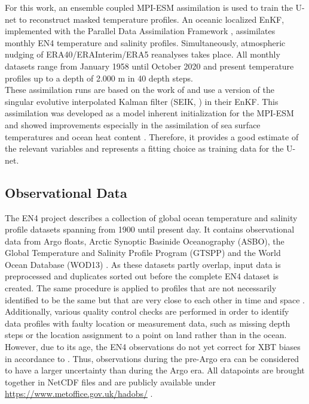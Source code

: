 \documentclass[Masterarbeit.tex]{subfile}
\begin{document}
	For this work, an ensemble coupled MPI-ESM assimilation \citep{brune_mpi-esm-lr_1201p5_2021} is used to train the U-net to reconstruct masked temperature profiles. An oceanic localized EnKF, implemented with the Parallel Data Assimilation Framework \citep{nerger_software_2013}, assimilates monthly EN4 temperature and salinity profiles. Simultaneously, atmospheric nudging of ERA40/ERAInterim/ERA5 reanalyses \citep{uppala_era-40_2005, dee_era-interim_2011, hersbach_era5_2020} takes place. All monthly datasets range from January 1958 until October 2020 and present temperature profiles up to a depth of 2.000 m in 40 depth steps.\\
	These assimilation runs are based on the work of \cite{brune_assimilation_2015} and use a version of the singular evolutive interpolated Kalman filter (SEIK, \cite{pham_filtres_1998}) in their EnKF. This assimilation was developed as a model inherent initialization for the MPI-ESM and showed improvements especially in the assimilation of sea surface temperatures and ocean heat content \citep{brune_assimilation_2015}. Therefore, it provides a good estimate of the relevant variables and represents a fitting choice as training data for the U-net.
	
	
	\subsection{Observational Data}
	
	The EN4 project describes a collection of global ocean temperature and salinity profile datasets spanning from 1900 until present day. It contains observational data from Argo floats, Arctic Synoptic Basinide Oceanography (ASBO), the Global Temperature and Salinity Profile Program (GTSPP) and the World Ocean Database (WOD13) \citep{good_en4_2013}. As these datasets partly overlap, input data is preprocessed and duplicates sorted out before the complete EN4 dataset is created. The same procedure is applied to profiles that are not necessarily identified to be the same but that are very close to each other in time and space \citep{good_en4_2013}. Additionally, various quality control checks are performed in order to identify data profiles with faulty location or measurement data, such as missing depth steps or the location assignment to a point on land rather than in the ocean. However, due to its age, the EN4 observations do not yet correct for XBT biases in accordance to \cite{cheng_time_2014}. Thus, observations during the pre-Argo era can be considered to have a larger uncertainty than during the Argo era. All datapoints are brought together in NetCDF files and are publicly available under \url{https://www.metoffice.gov.uk/hadobs/} \citep{good_en4_2013}. 
	
\end{document}
